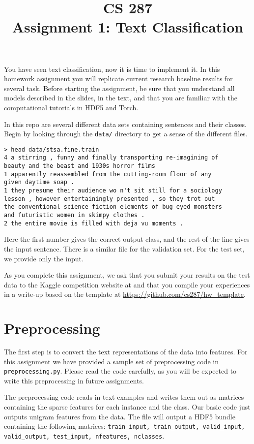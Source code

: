 \documentclass[11pt]{article}
\title{CS 287 \\ Assignment 1: Text Classification }
\date{}
\begin{document}
\maketitle{}

You have seen text classification, now it is time to implement it.  In
this homework assignment you will replicate current research baseline
results for several task. Before starting the assignment, be sure that
you understand all models described in the slides, in the text, and
that you are familiar with the computational tutorials in HDF5 and
Torch.


In this repo are several different data sets containing sentences and 
their classes. Begin by looking through the \texttt{data/} directory 
to get a sense of the different files.


\begin{verbatim}
> head data/stsa.fine.train
4 a stirring , funny and finally transporting re-imagining of 
beauty and the beast and 1930s horror films
1 apparently reassembled from the cutting-room floor of any 
given daytime soap .
1 they presume their audience wo n't sit still for a sociology 
lesson , however entertainingly presented , so they trot out 
the conventional science-fiction elements of bug-eyed monsters 
and futuristic women in skimpy clothes .
2 the entire movie is filled with deja vu moments .
\end{verbatim}

Here the first number gives the correct output class, and the rest of
the line gives the input sentence. There is a similar file for the
validation set. For the test set, we provide only the input.

As you complete this assignment, we ask that you submit your results
on the test data to the Kaggle competition website at \url{} and that
you compile your experiences in a write-up based on the template at
\url{https://github.com/cs287/hw_template}.

\section{Preprocessing}

The first step is to convert the text representations of the data into
features. For this assignment we have provided a sample set of
preprocessing code in \texttt{preprocessing.py}. Please read the code
carefully, as you will be expected to write this preprocessing in
future assignments.  

The preprocessing code reads in text examples and writes them
out as matrices containing the sparse features for each instance and
the class. Our basic code just outputs unigram features from the data.
The file will output a HDF5 bundle containing the following matrices:
\texttt{train\_input, train\_output, valid\_input, valid\_output,
  test\_input, nfeatures, nclasses}.
\end{document}
